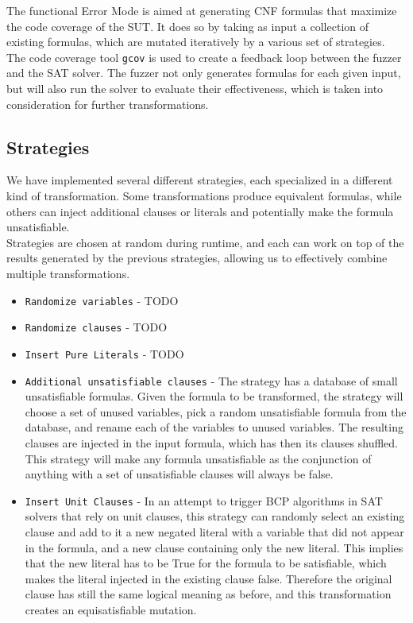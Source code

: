 \documentclass{article}
\begin{document}
The functional Error Mode is aimed at generating CNF formulas that maximize the code coverage of the SUT. 
It does so by taking as input a collection of existing formulas, which are mutated iteratively by a 
various set of strategies.\\

The code coverage tool \verb|gcov| is used to create a feedback loop between the fuzzer and the SAT solver.
The fuzzer not only generates formulas for each given input, but will also run the solver to evaluate
their effectiveness, which is taken into consideration for further transformations.

\subsection{Strategies}

We have implemented several different strategies, each specialized in a different kind of transformation.
Some transformations produce equivalent formulas, while others can inject additional clauses or literals
and potentially make the formula unsatisfiable. \\

Strategies are chosen at random during runtime, and each can work on top of the results generated by the
previous strategies, allowing us to effectively combine multiple transformations. \\

\begin{itemize}

\item \verb|Randomize variables| - TODO

\item \verb|Randomize clauses| - TODO

\item \verb|Insert Pure Literals| - TODO

\item \verb|Additional unsatisfiable clauses| - The strategy has a database of small unsatisfiable formulas.
Given the formula to be transformed, the strategy will choose a set of unused variables, pick a random
unsatisfiable formula from the database, and rename each of the variables to unused variables. The resulting
clauses are injected in the input formula, which has then its clauses shuffled.
This strategy will make any formula unsatisfiable as the conjunction of anything with a set of unsatisfiable
clauses will always be false.

\item \verb|Insert Unit Clauses| - In an attempt to trigger BCP algorithms in SAT solvers that rely on unit clauses,
this strategy can randomly select an existing clause and add to it a new negated literal with a variable that did
not appear in the formula, and a new clause containing only the new literal. This implies that the new
literal has to be True for the formula to be satisfiable, which makes the literal injected in the existing
clause false. Therefore the original clause has still the same logical meaning as before, and this transformation
creates an equisatisfiable mutation.

\end{itemize}
\end{document}
